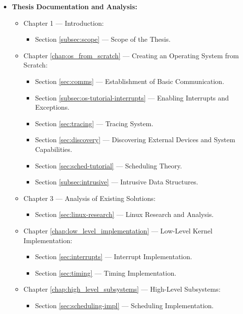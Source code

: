 \documentclass[a4paper,10pt,twoside]{report}
\theoremstyle{definition}
\begin{document}
\begin{itemize}
    \item \textbf{Thesis Documentation and Analysis:}
    \begin{itemize}
        \item Chapter 1 --- Introduction:
        \begin{itemize}
            \item Section \ref{subsec:scope} --- Scope of the Thesis.
        \end{itemize}

        \item Chapter \ref{chap:os_from_scratch} --- Creating an Operating System from Scratch:
        \begin{itemize}
            \item Section \ref{sec:comms} --- Establishment of Basic Communication.
            \item Section \ref{subsec:os-tutorial-interrupts} --- Enabling Interrupts and Exceptions.
            \item Section \ref{sec:tracing} --- Tracing System.
            \item Section \ref{sec:discovery} --- Discovering External Devices and System Capabilities.
            \item Section \ref{sec:sched-tutorial} --- Scheduling Theory.
            \item Section \ref{subsec:intrusive} --- Intrusive Data Structures.
        \end{itemize}

        \item Chapter 3 --- Analysis of Existing Solutions:
        \begin{itemize}
            \item Section \ref{sec:linux-research} --- Linux Research and Analysis.
        \end{itemize}

        \item Chapter \ref{chap:low_level_implementation} --- Low-Level Kernel Implementation:
        \begin{itemize}
            \item Section \ref{sec:interrupts} --- Interrupt Implementation.
            \item Section \ref{sec:timing} --- Timing Implementation.
        \end{itemize}

        \item Chapter \ref{chap:high_level_subsystems} --- High-Level Subsystems:
        \begin{itemize}
            \item Section \ref{sec:scheduling-impl} --- Scheduling Implementation.
        \end{itemize}


\end{itemize}
\end{itemize}
\end{document}
